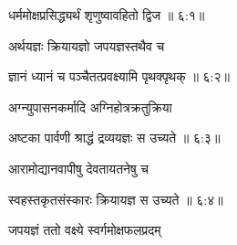 
{\devanagarifont धर्ममोक्षप्रसिद्ध्यर्थं शृणुष्वावहितो द्विज {॥ ६:१॥} \veg\dontdisplaylinenum }%

{\devanagarifont अर्थयज्ञः क्रियायज्ञो जपयज्ञस्तथैव च \thinspace{\dandab} \dontdisplaylinenum }%


{\devanagarifont ज्ञानं ध्यानं च पञ्चैतत्प्रवक्ष्यामि पृथक्पृथक् {॥ ६:२॥} \veg\dontdisplaylinenum }%



{\devanagarifont अग्न्युपासनकर्मादि अग्निहोत्रक्रतुक्रिया \thinspace{\dandab} \dontdisplaylinenum }%


{\devanagarifont अष्टका पार्वणी श्राद्धं द्रव्ययज्ञः स उच्यते {॥ ६:३॥} \veg\dontdisplaylinenum }%



{\devanagarifont आरामोद्यानवापीषु देवतायतनेषु च \thinspace{\dandab} \dontdisplaylinenum }%


{\devanagarifont स्वहस्तकृतसंस्कारः क्रियायज्ञ स उच्यते {॥ ६:४॥} \veg\dontdisplaylinenum }%



{\devanagarifont जपयज्ञं ततो वक्ष्ये स्वर्गमोक्षफलप्रदम् \thinspace{\dandab} \dontdisplaylinenum }%

